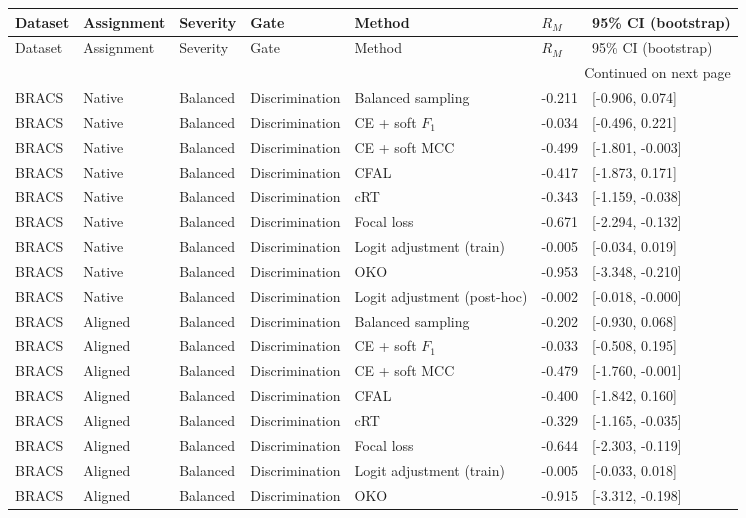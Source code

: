 \begin{longtable}{lllllll}
\toprule
Dataset & Assignment & Severity & Gate & Method & $R_M$ & 95\% CI (bootstrap) \\
\midrule
\endfirsthead
\toprule
Dataset & Assignment & Severity & Gate & Method & $R_M$ & 95\% CI (bootstrap) \\
\midrule
\endhead
\midrule
\multicolumn{7}{r}{Continued on next page} \\
\midrule
\endfoot
\bottomrule
\endlastfoot
BRACS & Native & Balanced & Discrimination & Balanced sampling & -0.211 & [-0.906, 0.074] \\
BRACS & Native & Balanced & Discrimination & CE + soft $F_1$ & -0.034 & [-0.496, 0.221] \\
BRACS & Native & Balanced & Discrimination & CE + soft MCC & -0.499 & [-1.801, -0.003] \\
BRACS & Native & Balanced & Discrimination & CFAL & -0.417 & [-1.873, 0.171] \\
BRACS & Native & Balanced & Discrimination & cRT & -0.343 & [-1.159, -0.038] \\
BRACS & Native & Balanced & Discrimination & Focal loss & -0.671 & [-2.294, -0.132] \\
BRACS & Native & Balanced & Discrimination & Logit adjustment (train) & -0.005 & [-0.034, 0.019] \\
BRACS & Native & Balanced & Discrimination & OKO & -0.953 & [-3.348, -0.210] \\
BRACS & Native & Balanced & Discrimination & Logit adjustment (post-hoc) & -0.002 & [-0.018, -0.000] \\
BRACS & Aligned & Balanced & Discrimination & Balanced sampling & -0.202 & [-0.930, 0.068] \\
BRACS & Aligned & Balanced & Discrimination & CE + soft $F_1$ & -0.033 & [-0.508, 0.195] \\
BRACS & Aligned & Balanced & Discrimination & CE + soft MCC & -0.479 & [-1.760, -0.001] \\
BRACS & Aligned & Balanced & Discrimination & CFAL & -0.400 & [-1.842, 0.160] \\
BRACS & Aligned & Balanced & Discrimination & cRT & -0.329 & [-1.165, -0.035] \\
BRACS & Aligned & Balanced & Discrimination & Focal loss & -0.644 & [-2.303, -0.119] \\
BRACS & Aligned & Balanced & Discrimination & Logit adjustment (train) & -0.005 & [-0.033, 0.018] \\
BRACS & Aligned & Balanced & Discrimination & OKO & -0.915 & [-3.312, -0.198] \\

\end{longtable}
